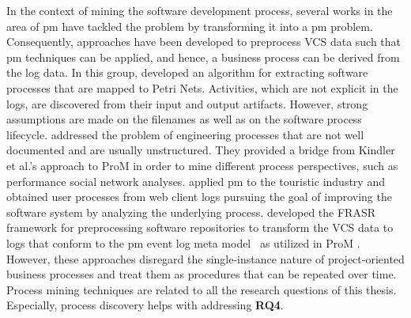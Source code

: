 

In the context of mining the software development process, several works in the area of \gls{pm} have tackled the problem by transforming it into a \gls{pm} problem. 
Consequently, approaches have been developed to preprocess VCS data such that \gls{pm} techniques can be applied, and hence, a business process can be derived from the log data.
In this group, \citep{DBLP:conf/se/KindlerRS06,kindler2006incremental} developed an algorithm for extracting software processes that are mapped to Petri Nets. Activities, which are not explicit in the logs, are discovered from their input and output artifacts. However, strong assumptions are made on the filenames as well as on the software process lifecycle. %
\cite{rubin2007process} addressed the problem of engineering processes that are not well documented and are usually unstructured. They provided a bridge from Kindler et al.'s approach to ProM \citep{van2005prom} in order to mine different process perspectives, such as performance social network analyses. %
\cite{rubin2014agile} applied \gls{pm} to the touristic industry and obtained user processes from web client logs pursuing the goal of improving the software system by analyzing the underlying process.
\cite{DBLP:conf/csmr/PoncinSB11} developed the FRASR framework for preprocessing software repositories to transform the VCS data to logs that conform to the \gls{pm} event log meta model~\citep{van2005meta} as utilized in ProM \citep{van2005prom}.
However, these approaches disregard the single-instance nature of project-oriented business processes and treat them as procedures that can be repeated over time.
Process mining techniques are related to all the research questions of this thesis. Especially, process discovery helps with addressing \textbf{RQ4}.

